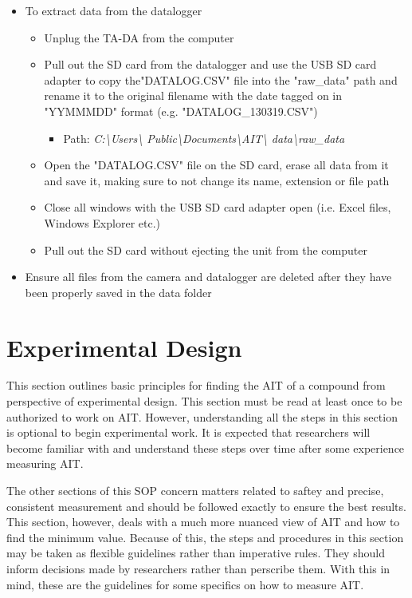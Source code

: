 \documentclass[letterpaper,11pt]{article}
\newcommand\blankpage{%
    \null
    \thispagestyle{empty}%
    \newpage}
\begin{document}
\begin{itemize}
    \item To extract data from the datalogger
        \begin{itemize}
        \item Unplug the TA-DA from the computer
        \item Pull out the SD card from the datalogger and use the USB SD card 
            adapter to copy the"DATALOG.CSV" file into the "raw\_data" path and 
            rename it to the original filename with the date 
            tagged on in "YYMMMDD" format (e.g. "DATALOG\_130319.CSV")
            \begin{itemize}
            \item Path: \textit{C:\textbackslash Users\textbackslash 
            Public\textbackslash Documents\textbackslash AIT\textbackslash 
            data\textbackslash raw\_data}
            \end{itemize}
        \item Open the "DATALOG.CSV" file on the SD card, erase all data from
            it and save it, making sure to not change its name, extension or 
            file path
        \item Close all windows with the USB SD card adapter open (i.e. Excel 
            files, Windows Explorer etc.)
        \item Pull out the SD card without ejecting the unit from the computer
        \end{itemize}
    
    \item Ensure all files from the camera and datalogger are deleted after they
        have been properly saved in the data folder 
            
    \end{itemize}

\newpage %
\section{Experimental Design}
This section outlines basic principles for finding the AIT of a compound from 
perspective of experimental design.
This section must be read at least once to be authorized to work on AIT. 
However, understanding all the steps in this section is optional to begin 
experimental work. It is expected that researchers will become familiar with and
understand these steps over time after some experience measuring AIT.

The other sections of this SOP concern matters related to saftey and precise, 
consistent measurement and should be followed exactly to ensure the best 
results. This section, however, deals with a much more nuanced view of AIT and
how to find the minimum value. Because of this, the steps and procedures in this
section may be taken as flexible guidelines rather than imperative rules. They
should inform decisions made by researchers rather than perscribe them. With 
this in mind, these are the guidelines for some specifics on how to measure AIT.
\end{document}
